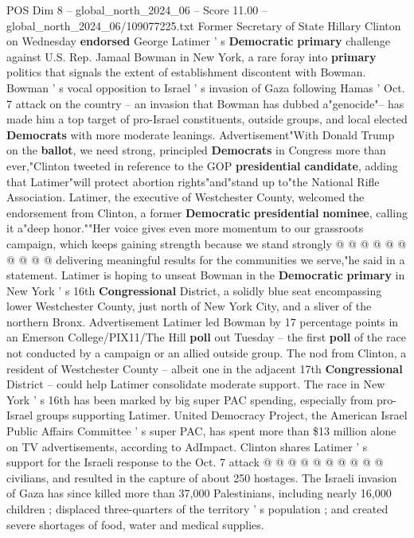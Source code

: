 \begin{textsample}{POS Dim 8 – global\_north\_2024\_06 – Score 11.00 – global\_north\_2024\_06/109077225.txt}  \label{ex:f8_pos_067}
Former Secretary of State Hillary Clinton on Wednesday \textbf{endorsed} George Latimer ' s \textbf{Democratic} \textbf{primary} challenge against U.S.
Rep.
Jamaal Bowman in New York, a rare foray into \textbf{primary} politics that signals the extent of establishment discontent with Bowman.
Bowman ' s vocal opposition to Israel ' s invasion of Gaza following Hamas ' Oct. 7 attack on the country -- an invasion that Bowman has dubbed a"genocide"-- has made him a top target of pro-Israel constituents, outside groups, and local elected \textbf{Democrats} with more moderate leanings.
Advertisement"With Donald Trump on the \textbf{ballot}, we need strong, principled \textbf{Democrats} in Congress more than ever,"Clinton tweeted in reference to the GOP \textbf{presidential} \textbf{candidate}, adding that Latimer"will protect abortion rights"and"stand up to"the National Rifle Association.
Latimer, the executive of Westchester County, welcomed the endorsement from Clinton, a former \textbf{Democratic} \textbf{presidential} \textbf{nominee}, calling it a"deep honor.""Her voice gives even more momentum to our grassroots campaign, which keeps gaining strength because we stand strongly @ @ @ @ @ @ @ @ @ @ delivering meaningful results for the communities we serve,"he said in a statement.
Latimer is hoping to unseat Bowman in the \textbf{Democratic} \textbf{primary} in New York ' s 16th \textbf{Congressional} District, a solidly blue seat encompassing lower Westchester County, just north of New York City, and a sliver of the northern Bronx.
Advertisement Latimer led Bowman by 17 percentage points in an Emerson College/PIX11/The Hill \textbf{poll} out Tuesday -- the first \textbf{poll} of the race not conducted by a campaign or an allied outside group.
The nod from Clinton, a resident of Westchester County -- albeit one in the adjacent 17th \textbf{Congressional} District -- could help Latimer consolidate moderate support.
The race in New York ' s 16th has been marked by big super PAC spending, especially from pro-Israel groups supporting Latimer.
United Democracy Project, the American Israel Public Affairs Committee ' s super PAC, has spent more than \$13 million alone on TV advertisements, according to AdImpact.
Clinton shares Latimer ' s support for the Israeli response to the Oct. 7 attack @ @ @ @ @ @ @ @ @ @ civilians, and resulted in the capture of about 250 hostages.
The Israeli invasion of Gaza has since killed more than 37,000 Palestinians, including nearly 16,000 children ; displaced three-quarters of the territory ' s population ; and created severe shortages of food, water and medical supplies.

\end{textsample}
